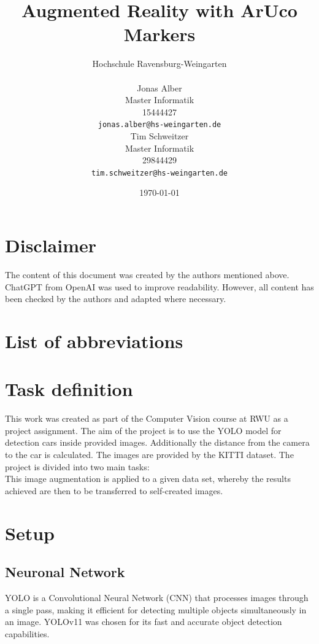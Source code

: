 \documentclass[a4paper,twocolumn]{article}
\title{Augmented Reality with ArUco Markers}
\author{
    Hochschule Ravensburg-Weingarten \\ %
    \begin{minipage}[t]{0.45\textwidth} %
        \centering
        Jonas Alber \\ %
        Master Informatik \\
        15444427\\
        \texttt{jonas.alber@hs-weingarten.de} %
    \end{minipage}
    \hfill
    \begin{minipage}[t]{0.45\textwidth} %
        \centering
        Tim Schweitzer \\ Master Informatik \\  29844429  \\%
        \texttt{tim.schweitzer@hs-weingarten.de} %
    \end{minipage}
}
\date{\today}
\begin{document}
\maketitle

\section*{Disclaimer}
The content of this document was created by the authors mentioned above. ChatGPT from OpenAI was used to improve readability. However, all content has been checked by the authors and adapted where necessary.

\section*{List of abbreviations}
\begin{acronym}[RWU]
\end{acronym}


\section{Task definition}
This work was created as part of the Computer Vision course at \ac{RWU} as a project assignment. The aim of the project is to use the \ac{YOLO} model for detection cars inside provided images. Additionally the distance from the camera to the car is calculated. The images are provided by the \ac{KITTI} dataset. The project is divided into two main tasks:
\\
This image augmentation is applied to a given data set, whereby the results achieved are then to be transferred to self-created images.

\section{Setup}

\subsection{Neuronal Network}

\ac{YOLO} is a Convolutional Neural Network (CNN) that processes images through a single pass, making it efficient for detecting multiple objects simultaneously in an image.
YOLOv11 was chosen for its fast and accurate object detection capabilities.
\end{document}
